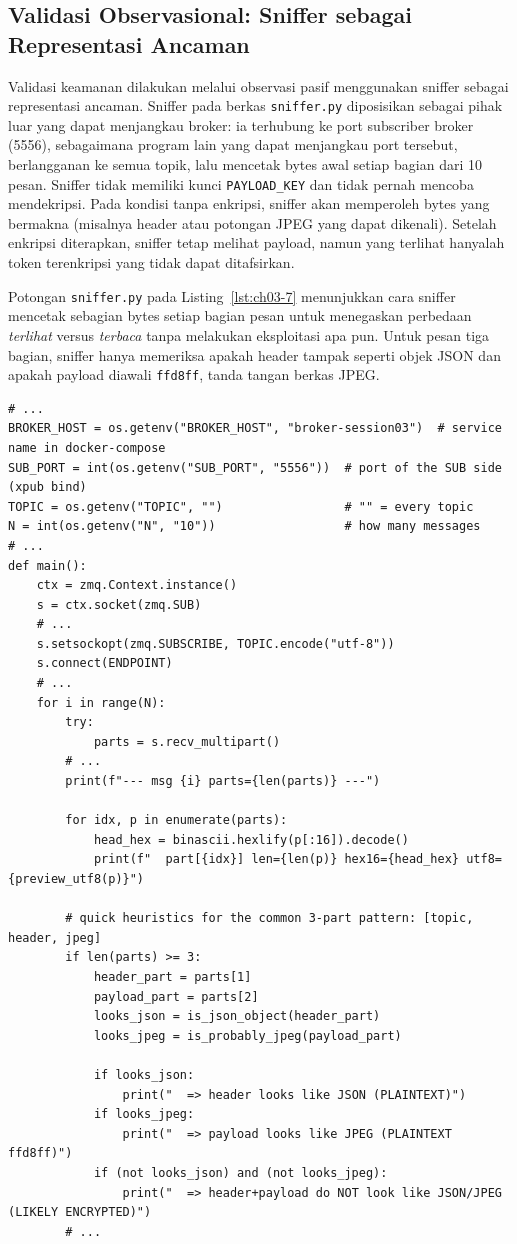 \subsection*{Validasi Observasional: Sniffer sebagai Representasi Ancaman}

Validasi keamanan dilakukan melalui observasi pasif menggunakan sniffer sebagai representasi ancaman. Sniffer pada berkas \texttt{sniffer.py} diposisikan sebagai pihak luar yang dapat menjangkau broker: ia terhubung ke port subscriber broker (5556), sebagaimana program lain yang dapat menjangkau port tersebut, berlangganan ke semua topik, lalu mencetak bytes awal setiap bagian dari 10 pesan. Sniffer tidak memiliki kunci \texttt{PAYLOAD\_KEY} dan tidak pernah mencoba mendekripsi. Pada kondisi tanpa enkripsi, sniffer akan memperoleh bytes yang bermakna (misalnya header atau potongan JPEG yang dapat dikenali). Setelah enkripsi diterapkan, sniffer tetap melihat payload, namun yang terlihat hanyalah token terenkripsi yang tidak dapat ditafsirkan.

Potongan \texttt{sniffer.py} pada Listing~\ref{lst:ch03-7} menunjukkan cara sniffer mencetak sebagian bytes setiap bagian pesan untuk menegaskan perbedaan \emph{terlihat} versus \emph{terbaca} tanpa melakukan eksploitasi apa pun. Untuk pesan tiga bagian, sniffer hanya memeriksa apakah header tampak seperti objek JSON dan apakah payload diawali \texttt{ffd8ff}, tanda tangan berkas JPEG.

\begin{lstlisting}[style=PythonStyle, caption={sniffer.py (excerpt): visible bytes, unreadable without key}, label={lst:ch03-7}]
# ...
BROKER_HOST = os.getenv("BROKER_HOST", "broker-session03")  # service name in docker-compose
SUB_PORT = int(os.getenv("SUB_PORT", "5556"))  # port of the SUB side (xpub bind)
TOPIC = os.getenv("TOPIC", "")                 # "" = every topic
N = int(os.getenv("N", "10"))                  # how many messages
# ...
def main():
    ctx = zmq.Context.instance()
    s = ctx.socket(zmq.SUB)
    # ...
    s.setsockopt(zmq.SUBSCRIBE, TOPIC.encode("utf-8"))
    s.connect(ENDPOINT)
    # ...
    for i in range(N):
        try:
            parts = s.recv_multipart()
        # ...
        print(f"--- msg {i} parts={len(parts)} ---")

        for idx, p in enumerate(parts):
            head_hex = binascii.hexlify(p[:16]).decode()
            print(f"  part[{idx}] len={len(p)} hex16={head_hex} utf8={preview_utf8(p)}")

        # quick heuristics for the common 3-part pattern: [topic, header, jpeg]
        if len(parts) >= 3:
            header_part = parts[1]
            payload_part = parts[2]
            looks_json = is_json_object(header_part)
            looks_jpeg = is_probably_jpeg(payload_part)

            if looks_json:
                print("  => header looks like JSON (PLAINTEXT)")
            if looks_jpeg:
                print("  => payload looks like JPEG (PLAINTEXT ffd8ff)")
            if (not looks_json) and (not looks_jpeg):
                print("  => header+payload do NOT look like JSON/JPEG (LIKELY ENCRYPTED)")
        # ...
\end{lstlisting}

